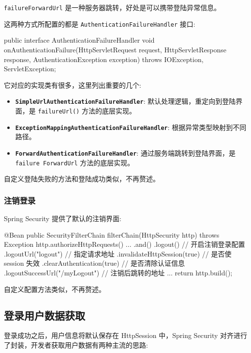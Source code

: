 \texttt{failureForwardUrl} 是一种服务器跳转，好处是可以携带登陆异常信息。

这两种方式所配置的都是 \texttt{AuthenticationFailureHandler} 接口:

\begin{Java}
public interface AuthenticationFailureHandler {
    void onAuthenticationFailure(HttpServletRequest request, HttpServletResponse response, AuthenticationException exception) throws IOException, ServletException;
}
\end{Java}

它对应的实现类有很多，这里列出重要的几个:
\begin{itemize}
  \item \textbf{\texttt{SimpleUrlAuthenticationFailureHandler}}: 默认处理逻辑，重定向到登陆界面，是 \texttt{failureUrl()} 方法的底层实现。
  \item \textbf{\texttt{ExceptionMappingAuthenticationFailureHandler}}: 根据异常类型映射到不同路径。
  \item \textbf{\texttt{ForwardAuthenticationFailureHandler}}: 通过服务端跳转到登陆界面，是 \texttt{failure ForwardUrl} 方法的底层实现。
\end{itemize}

自定义登陆失败的方法和登陆成功类似，不再赘述。

\subsubsection{注销登录}

Spring Security 提供了默认的注销界面:

\begin{Java}
@Bean
public SecurityFilterChain filterChain(HttpSecurity http) throws Exception {
    http.authorizeHttpRequests()
        ...
        .and()
        .logout()   // 开启注销登录配置
        .logoutUrl("logout")  // 指定请求地址
        .invalidateHttpSession(true)  // 是否使 session 失效
        .clearAuthentication(true)    // 是否清除认证信息
        .logoutSuccessUrl("/myLogout")  // 注销后跳转的地址
        ...
    return http.build();
}
\end{Java}

自定义配置方法类似，不再赘述。

\subsection{登录用户数据获取}

登录成功之后，用户信息将默认保存在 HttpSession 中，Spring Security 对齐进行了封装，开发者获取用户数据有两种主流的思路:

